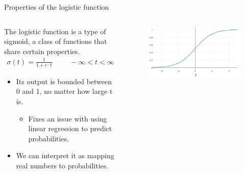 \documentclass[aspectratio=169]{../latex_main/tntbeamer}  %
\begin{document}
	
	\begin{frame}{Properties of the logistic function}
	   
	   \begin{columns}
	    
	   \begin{column}{.5\textwidth}
	   The logistic function is a type of sigmoid, a class of functions that share certain properties.
	   \begin{align*}
	       \sigma (t) = \frac{1}{1 + e^-t} \hspace{1cm} -\infty < t < \infty
	   \end{align*}
	   \begin{itemize}
	       \item Its output is bounded between 0 and 1, no matter how large t is.
	       \begin{itemize}
	           \item Fixes an issue with using linear regression to predict probabilities.
	       \end{itemize}
	       \item We can interpret it as mapping real numbers to probabilities.
	   \end{itemize}
	    \end{column}
	    \begin{column}{.5\textwidth}
	        \begin{figure}
	            \centering
	            \includegraphics[scale=.65]{Bild9}
	        \end{figure}
	    \end{column}
	    
	    \end{columns}
	\end{frame}
	
\end{document}
